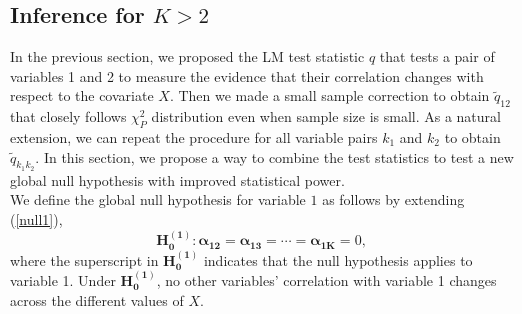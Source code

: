 \documentclass[12pt]{extarticle}
\theoremstyle{theorem}
\begin{document}
\subsection{Inference for $K>2$}
In the previous section, we proposed the LM test statistic $q$ that tests a pair of variables 1 and 2 to measure the evidence that their correlation changes with respect to the covariate $X$. Then we made a small sample correction to obtain $\tilde{q}_{12}$ that closely follows $\chi_{P}^2$ distribution even when sample size is small. As a natural extension, we can repeat the procedure for all variable pairs $k_1$ and $k_2$ to obtain $\tilde{q}_{k_1k_2}$. In this section, we propose a way to combine the test statistics to test a new global null hypothesis with improved statistical power. \\

\noindent
We define the global null hypothesis for variable $1$ as follows by extending (\ref{null1}),
	\begin{equation}
\bm{H_0^{(1)}}: \bm{\alpha_{12}} = \bm{\alpha_{13}} = \cdots = \bm{\alpha_{1K}} = 0,
\label{newnull}
\end{equation}
where the superscript in $\bm{H_0^{(1)}}$ indicates that the null hypothesis applies to variable 1. Under $\bm{H_0^{(1)}}$, no other variables' correlation with variable 1 changes across the different values of  $X$. \\
\end{document}
